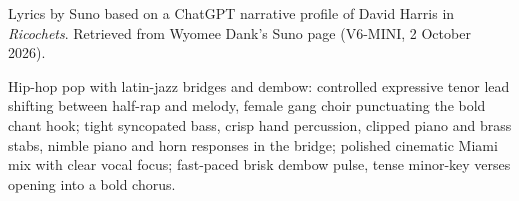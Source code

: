 
\begin{notes}
Lyrics by Suno based on a ChatGPT narrative profile of David Harris in \emph{Ricochets}. Retrieved from Wyomee Dank’s Suno page (V6-MINI, 2 October 2026).
\end{notes}
\begin{style}
Hip-hop pop with latin-jazz bridges and dembow: controlled expressive tenor lead shifting between half-rap and melody, female gang choir punctuating the bold chant hook; tight syncopated bass, crisp hand percussion, clipped piano and brass stabs, nimble piano and horn responses in the bridge; polished cinematic Miami mix with clear vocal focus; fast-paced brisk dembow pulse, tense minor-key verses opening into a bold chorus.
\end{style}

